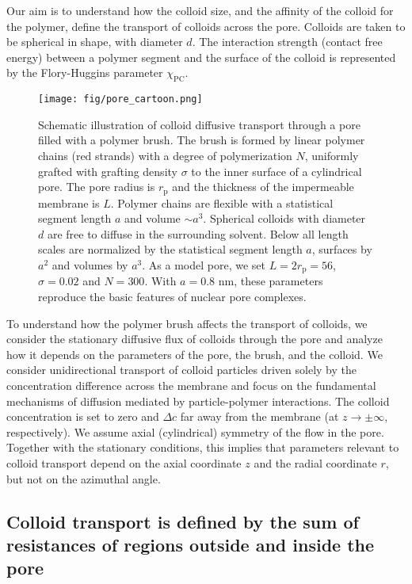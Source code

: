 \documentclass[12pt, a4paper]{article}
\begin{document}
Our aim is to understand how the colloid size, and the affinity of the colloid for the polymer, define the transport of colloids across the pore.
Colloids are taken to be spherical in shape, with diameter $d$.
The interaction strength (contact free energy) between a polymer segment and the surface of the colloid is represented by the Flory-Huggins parameter $\chi_{\text{PC}}$.

\begin{figure}
    \centering
    \texttt{[image: fig/pore\_cartoon.png]}
    \caption{
        Schematic illustration of colloid diffusive transport through a pore filled with a polymer brush. 
        The brush is formed by linear polymer chains (red strands) with a degree of polymerization $N$, uniformly grafted with grafting density $\sigma$ 
        to the inner surface of a cylindrical pore.
        The pore radius is $r_{\text{p}}$ and the thickness of the impermeable membrane is $L$.
        Polymer chains are flexible with a statistical segment length $a$ and volume $\sim a^3$. 
        Spherical colloids with diameter $d$ are free to diffuse in the surrounding solvent.
        Below all length scales are normalized by the statistical segment length $a$, surfaces by $a^2$ and volumes by $a^3$.
        As a model pore, we set $L = 2r_{\text{p}} = 56$, $\sigma = 0.02$ and $N = 300$.
        With $a = 0.8 {\text{ nm}}$, these parameters reproduce the basic features of nuclear pore complexes.
          }
    \label{fig:colloid_transport}
\end{figure}

To understand how the polymer brush affects the transport of colloids, we consider the stationary diffusive flux of colloids through the pore and analyze how it depends on the parameters of the pore, the brush, and the colloid.
We consider unidirectional transport of colloid particles driven solely by the concentration difference across the membrane and focus on the fundamental mechanisms of diffusion mediated by particle-polymer interactions.
The colloid concentration is set to zero and $\Delta c$ far away from the membrane (at $z\rightarrow\pm\infty$, respectively).
We assume axial (cylindrical) symmetry of the flow in the pore.
Together with the stationary conditions, this implies that parameters relevant to colloid transport depend on the axial coordinate $z$ and the radial coordinate $r$, but not on the azimuthal angle.


\subsection{Colloid transport is defined by the sum of resistances of regions outside and inside the pore}
\end{document}
